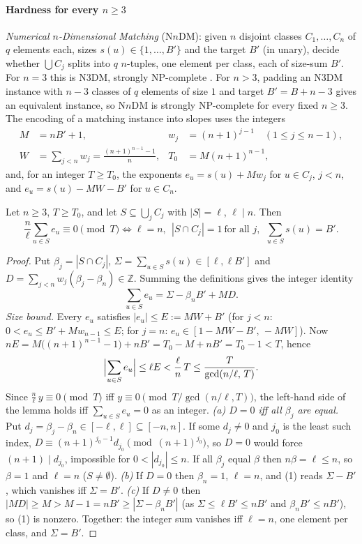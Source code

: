 \documentclass[preprint,12pt]{elsarticle}
\theoremstyle{definition}\newtheorem{defi}[thm]{Definition}\newtheorem{prob}[thm]{Problem}\newtheorem{obs}[thm]{Observation}
\theoremstyle{remark}\newtheorem{rem}[thm]{Remark}
\newcommand{\ZZ}{\mathbb Z}\newcommand{\Sym}{\operatorname{Sym}}\newcommand{\Alt}{\operatorname{Alt}}
\begin{document}
\paragraph{Hardness for every $n\ge3$}
\emph{Numerical $n$-Dimensional Matching} ($\mathrm{N}n\mathrm{DM}$): given $n$ disjoint classes $C_1,\dots,C_n$ of $q$ elements each, sizes
$s(u)\in\{1,\dots,B'\}$ and the target $B'$ (in unary), decide whether $\bigcup C_j$ splits into $q$ $n$-tuples, one element per class, each of
size-sum $B'$. For $n=3$ this is N3DM, strongly NP-complete \cite[SP16]{garey1979}. For $n>3$, padding an N3DM instance with $n-3$ classes of
$q$ elements of size $1$ and target $B'=B+n-3$ gives an equivalent instance, so $\mathrm{N}n\mathrm{DM}$ is strongly NP-complete for every fixed $n\ge3$.
The encoding of a matching instance into slopes uses the integers
\begin{align*} M&=nB'+1,& w_j&=(n+1)^{j-1}\quad(1\le j\le n-1),\\ W&=\sum_{j<n}w_j=\frac{(n+1)^{n-1}-1}{n},& T_0&=M(n+1)^{n-1}, \end{align*}
and, for an integer $T\ge T_0$, the exponents $e_u=s(u)+Mw_j$ for $u\in C_j$, $j<n$, and $e_u=s(u)-MW-B'$ for $u\in C_n$.

\begin{lem}\label{lem:encn}
Let $n\ge3$, $T\ge T_0$, and let $S\subseteq\bigcup_jC_j$ with $|S|=\ell$, $\ell\mid n$. Then
\[ \frac{n}{\ell}\sum_{u\in S}e_u\equiv0\pmod T \iff \ell=n,\ \ |S\cap C_j|=1\ \text{for all } j,\ \ \sum_{u\in S}s(u)=B'. \]
\end{lem}
\begin{proof}
Put $\beta_j=|S\cap C_j|$, $\Sigma=\sum_{u\in S}s(u)\in[\ell,\ell B']$ and $D=\sum_{j<n}w_j(\beta_j-\beta_n)\in\ZZ$. Summing the
definitions gives the integer identity
\[ \sum_{u\in S}e_u=\Sigma-\beta_nB'+MD. \tag{1} \]
\emph{Size bound.} Every $e_u$ satisfies $|e_u|\le E:=MW+B'$ (for $j<n$: $0<e_u\le B'+Mw_{n-1}\le E$; for $j=n$:
$e_u\in[1-MW-B',\,-MW]$). Now $nE=M\bigl((n+1)^{n-1}-1\bigr)+nB'=T_0-M+nB'=T_0-1<T$, hence
\[ \Bigl|\sum_{u\in S}e_u\Bigr|\le\ell E<\frac{\ell}{n}\,T\le\frac{T}{\gcd(n/\ell,\,T)}. \]
Since $\frac n\ell\,y\equiv0\pmod T$ iff $y\equiv0\pmod{T/\gcd(n/\ell,T)}$, the left-hand side of the lemma holds iff
$\sum_{u\in S}e_u=0$ as an integer.
\emph{(a) $D=0$ iff all $\beta_j$ are equal.} Put $d_j=\beta_j-\beta_n\in[-\ell,\ell]\subseteq[-n,n]$. If some $d_j\ne0$ and $j_0$ is the
least such index, $D\equiv(n+1)^{j_0-1}d_{j_0}\pmod{(n+1)^{j_0}}$, so $D=0$ would force $(n+1)\mid d_{j_0}$, impossible for
$0<|d_{j_0}|\le n$. If all $\beta_j$ equal $\beta$ then $n\beta=\ell\le n$, so $\beta=1$ and $\ell=n$ ($S\ne\emptyset$).
\emph{(b)} If $D=0$ then $\beta_n=1$, $\ell=n$, and (1) reads $\Sigma-B'$, which vanishes iff $\Sigma=B'$.
\emph{(c)} If $D\ne0$ then $|MD|\ge M>M-1=nB'\ge|\Sigma-\beta_nB'|$ (as $\Sigma\le\ell B'\le nB'$ and $\beta_nB'\le nB'$), so (1) is
nonzero. Together: the integer sum vanishes iff $\ell=n$, one element per class, and $\Sigma=B'$.
\end{proof}
\end{document}
